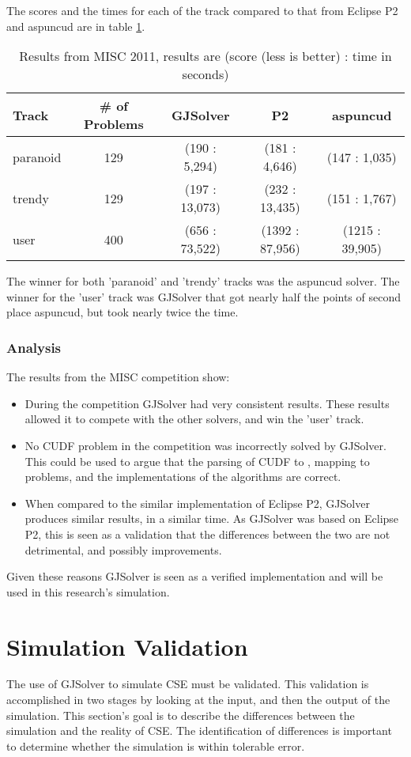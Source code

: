 The scores and the times for each of the track compared to that from Eclipse P2 and aspuncud are in table \ref{impl.misc2011}.
\begin{table}
\begin{tabular}{| l | c | c | c | c |}\hline
Track & \# of Problems & GJSolver & P2 & aspuncud\\ \hline
paranoid & 129 & (190 : 5,294) & (181 : 4,646) & (147 : 1,035) \\ \hline
trendy & 129 & (197 : 13,073) & (232 : 13,435) & (151 : 1,767) \\ \hline
user & 400 & (656 : 73,522) & (1392 : 87,956) & (1215 : 39,905) \\ \hline
\end{tabular}
\caption{Results from MISC 2011, results are (score (less is better) : time in seconds)}
\label{impl.misc2011}
\end{table}

The winner for both 'paranoid' and 'trendy' tracks was the aspuncud solver.
The winner for the 'user' track was GJSolver that got nearly half the points of second place aspuncud, but took nearly twice the time.

\subsubsection{Analysis}
The results from the MISC competition show:
\begin{itemize}
  \item During the competition GJSolver had very consistent results.
These results allowed it to compete with the other solvers, and win the 'user' track.
 \item No CUDF problem in the competition was incorrectly solved by GJSolver. 
 This could be used to argue that the parsing of CUDF to \modelname, mapping to \modelimpl problems, and the implementations of the algorithms are correct.
 \item When compared to the similar implementation of Eclipse P2, GJSolver produces similar results, in a similar time. 
 As GJSolver was based on Eclipse P2, this is seen as a validation that the differences between the two are not detrimental, and possibly improvements. 
\end{itemize}

Given these reasons GJSolver is seen as a verified implementation and will be used in this research's simulation.


\section{Simulation Validation}
The use of GJSolver to simulate CSE must be validated.
This validation is accomplished in two stages by looking at the input, and then the output of the simulation.
This section's goal is to describe the differences between the simulation and the reality of CSE.
The identification of differences is important to determine whether the simulation is within tolerable error. 

